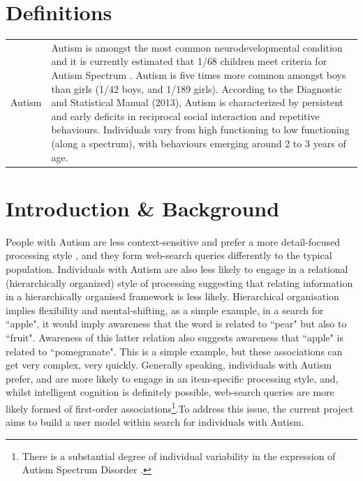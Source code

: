 \documentclass[a4paper, 11pt]{article}
\begin{document}
\begin{justify}
\section*{Definitions}
\begin{tabular}{l p{15cm}  }
Autism & Autism is amongst the most common neurodevelopmental condition and it is currently estimated that 1/68 children meet criteria for Autism Spectrum \cite{CDC}. Autism is five times more common amongst boys than girls (1/42 boys, and 1/189 girls). According to the Diagnostic and Statistical Manual (2013), Autism is characterized by persistent and early deficits in reciprocal social interaction and repetitive behaviours. Individuals vary from high functioning to low functioning (along a spectrum), with behaviours emerging around 2 to 3 years of age.
\end{tabular}
\clearpage

\section{Introduction \& Background}\label{prob}
People with Autism are less context-sensitive and prefer a more detail-focused processing style \cite{mottron}, and they form web-search queries differently to the typical population. Individuals with Autism are also less likely to engage in a relational (hierarchically organized) style of processing \cite{bowler} suggesting that relating information in a hierarchically organised framework is less likely. Hierarchical organisation implies flexibility and mental-shifting, as a simple example, in a search for ``apple", it would imply awareness that the word is related to ``pear" but also to ``fruit". Awareness of this latter relation also suggests awareness that ``apple" is related to ``pomegranate". This is a simple example, but these associations can get very complex, very quickly. Generally speaking, individuals with Autism prefer, and are more likely to engage in an item-specific processing style, and, whilst intelligent cognition is definitely possible, web-search queries are more likely formed of first-order associations\footnote{There is a substantial degree of individual variability in the expression of Autism Spectrum Disorder \cite{CDC}.}.To address this issue, the current project aims to build a user model within search for individuals with Autism. 


\end{justify}
\end{document}
